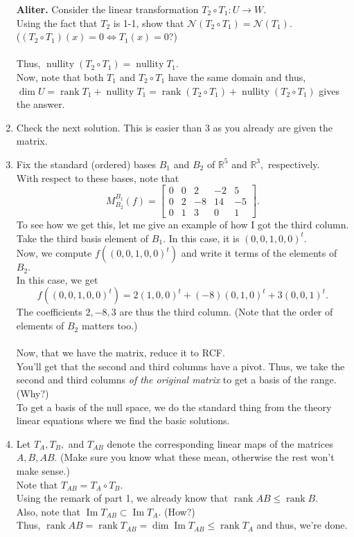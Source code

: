 \documentclass{article}
\newcommand{\rank}{\operatorname{rank}}
\renewcommand{\Im}{\operatorname{Im}}
\begin{document}
\begin{enumerate}
	\hrulefill

	\textbf{Aliter.} Consider the linear transformation $T_2\circ T_1:U \to W.$\\
	Using the fact that $T_2$ is 1-1, show that $\mathcal{N}(T_2\circ T_1) = \mathcal{N}(T_1).$\\
	($(T_2\circ T_1)(x) = 0 \iff T_1(x) = 0$?)\\~\\
	Thus, $\operatorname{nullity}(T_2\circ T_1) = \operatorname{nullity} T_1.$\\
	Now, note that both $T_1$ and $T_2\circ T_1$ have the same domain and thus, $\dim U = \rank T_1 + \operatorname{nullity} T_1 = \rank(T_2\circ T_1) + \operatorname{nullity}(T_2 \circ T_1)$ gives the answer.
	\item Check the next solution. This is easier than 3 as you already are given the matrix.
	\item Fix the standard (ordered) bases $B_1$ and $B_2$ of $\mathbb{R}^5$ and $\mathbb{R}^3,$ respectively.\\
	With respect to these bases, note that
	\[M^{B_1}_{B_2}(f) = \begin{bmatrix}
		0 & 0 & 2 & -2 & 5\\
		0 & 2 & -8 & 14 & -5\\
		0 & 1 & 3 & 0 & 1
	\end{bmatrix}.\]
	To see how we get this, let me give an example of how I got the third column.\\
	Take the third basis element of $B_1.$ In this case, it is $(0, 0, 1, 0, 0)^t.$\\
	Now, we compute $f((0, 0, 1, 0, 0)^t)$ and write it terms of the elements of $B_2.$\\
	In this case, we get
	\[f((0, 0, 1, 0, 0)^t) = 2(1, 0, 0)^t  + (-8)(0, 1, 0)^t + 3(0, 0, 1)^t.\]
	The coefficients $2, -8, 3$ are thus the third column. (Note that the order of elements of $B_2$ matters too.)\\~\\
	Now, that we have the matrix, reduce it to RCF.\\
	You'll get that the second and third columns have a pivot. Thus, we take the second and third columns \emph{of the original matrix} to get a basis of the range. \hfill (Why?)\\
	To get a basis of the null space, we do the standard thing from the theory linear equations where we find the basic solutions.
	\item Let $T_A, T_B,$ and $T_{AB}$ denote the corresponding linear maps of the matrices $A, B, AB.$ (Make sure you know what these mean, otherwise the rest won't make sense.) \\
	Note that $T_{AB} = T_A\circ T_B.$\\
	Using the remark of part 1, we already know that $\rank AB \le \rank B.$\\
	Also, note that $\Im T_{AB} \subset \Im T_A.$ \hfill (How?)\\
	Thus, $\rank AB = \rank T_{AB} = \dim \Im T_{AB} \le \rank T_{A}$ and thus, we're done.


\end{enumerate}
\end{document}
